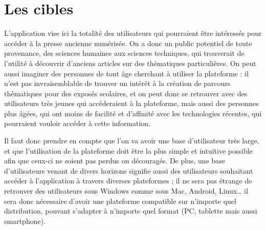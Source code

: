 \section{Les cibles}
\label{sec:cibles}
    L’application vise ici la totalité des utilisateurs qui pourraient être intéressés
    pour accéder à la presse ancienne numérisée. On a donc un public potentiel de toute provenance,
    des sciences humaines aux sciences techniques, qui trouverait de l’utilité à découvrir
    d’anciens articles sur des thématiques particulières. On peut aussi imaginer des personnes
    de tout âge cherchant à utiliser la plateforme : il n’est pas invraisemblable de trouver un intérêt
    à la création de parcours thématiques pour des exposés scolaires, et on peut donc
    se retrouver avec des utilisateurs très jeunes qui accéderaient à la plateforme, mais aussi
    des personnes plus âgées, qui ont moins de facilité et d’affinité avec les technologies récentes,
    qui pourraient vouloir accéder à cette information.

    Il faut donc prendre en compte que l’on va avoir une base d’utilisateur très large,
    et que l’utilisation de la plateforme doit être la plus simple et intuitive possible
    afin que ceux-ci ne soient pas perdus ou découragés. De plus, une base d’utilisateurs
    venant de divers horizons signifie aussi des utilisateurs souhaitant accéder à l’application
    à travers diverses plateformes ; il ne sera pas étrange de retrouver des utilisateurs sous Windows
    comme sous Mac, Android, Linux… il sera donc nécessaire d’avoir une plateforme compatible
    sur n’importe quel distribution, pouvant s’adapter à n’importe quel format (PC, tablette mais aussi smartphone).
